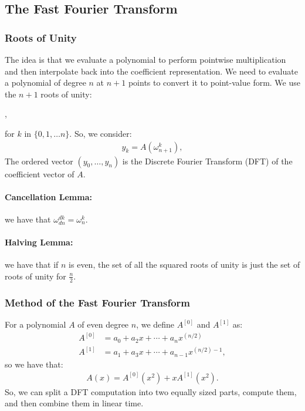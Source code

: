 \subsection{The Fast Fourier Transform}

\subsubsection{Roots of Unity}

The idea is that we evaluate a polynomial to perform pointwise
multiplication and then interpolate back into the coefficient representation.
We need to evaluate a polynomial of degree $n$ at $n + 1$ points to
convert it to point-value form. We use the $n + 1$ roots of unity:
\begin{center}
    ,
\end{center} for $k$ in $\{0, 1, \ldots n\}$. So, we consider:
\begin{gather*}
  y_k = A(\omega_{n + 1}^k),
\end{gather*}
The ordered vector $(y_0, \ldots, y_n)$ is the 
Discrete Fourier Transform (DFT) of the coefficient vector of $A$.

\paragraph{Cancellation Lemma:} we have that 
$\omega_{dn}^{dk} = \omega_{n}^{k}$.

\paragraph{Halving Lemma:} we have that if $n$ is even, the set of all
the squared roots of unity is just the set of roots of unity for $\frac{n}{2}$.

\subsubsection{Method of the Fast Fourier Transform}

For a polynomial $A$ of even degree $n$,
we define $A^{[0]}$ and $A^{[1]}$ as: \begin{align*}
  A^{[0]} &= a_0 + a_2x + \cdots + a_{n}x^{(n / 2)} \\
  A^{[1]} &= a_1 + a_3x + \cdots + a_{n - 1}x^{(n / 2) - 1},
\end{align*} so we have that: \begin{gather*}
  A(x) = A^{[0]}(x^2) + xA^{[1]}(x^2).
\end{gather*} So, we can split a DFT computation into two
equally sized parts, compute them, and then combine them in linear time.


